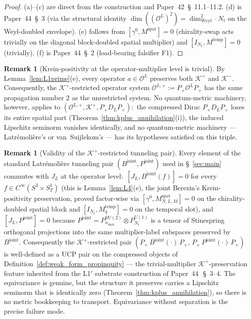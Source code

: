\documentclass[11pt,a4paper]{article}
\theoremstyle{plain}
\theoremstyle{definition}
\newtheorem{remark}[theorem]{Remark}
\newcommand{\nmax}{n_{\max}}
\newcommand{\Nt}{N_{t}}
\newcommand{\Manifold}{S^{3}\times S^{1}_{T}}
\newcommand{\Krein}{\mathcal{K}}
\newcommand{\Op}{\mathcal{O}}
\newcommand{\SU}{\mathrm{SU}}
\newcommand{\Uone}{U(1)}
\newcommand{\DL}{D_{L}}
\newcommand{\JL}{J_{L}}
\newcommand{\Bjoint}{B^{\mathrm{joint}}}
\newcommand{\Pjoint}{P^{\mathrm{joint}}}
\newcommand{\Kplus}{\Krein^{+}}
\newcommand{\Kminus}{\Krein^{-}}
\newcommand{\Pplus}{P_{+}}
\newcommand{\spat}{\mathrm{spat}}
\newcommand{\temp}{\mathrm{temp}}
\newcommand{\Weyl}{\mathrm{Weyl}}
\begin{document}
\begin{proof}
(a)--(c) are direct from the construction and Paper~42~\S~11.1--11.2.
(d) is Paper~44~\S~3 (via the structural identity $\dim((\Op^{L})^{2})
= \dim_{\Weyl}^{2} \cdot \Nt$ on the Weyl-doubled envelope).
(e) follows from $[\gamma^{0}, M^{\spat}] = 0$ (chirality-swap acts
trivially on the diagonal block-doubled spatial multiplier) and
$[I_{\Nt}, M^{\temp}] = 0$ (trivially). (f) is Paper~44~\S~2 (load-bearing
falsifier F1). \qedhere
\end{proof}

\begin{remark}[Krein-positivity at the operator-multiplier level is
trivial]\label{rem:Kplus_trivial}
By Lemma~\ref{lem:L1prime}(e), every operator $a \in \Op^{L}$
preserves both $\Kplus$ and $\Kminus$. Consequently, the
$\Kplus$-restricted operator system $\Op^{L,+} := \Pplus
\Op^{L} \Pplus$ has the same propagation number $2$ as the
unrestricted system. No quantum-metric machinery, however, applies
to $(\Op^{L,+}, \Kplus, \Pplus \DL \Pplus)$:\ the
compressed Dirac $\Pplus \DL \Pplus$ loses its entire spatial part
(Theorem~\ref{thm:kplus_annihilation}(i)), the induced Lipschitz
seminorm vanishes identically, and no quantum-metric machinery —
Latr\'emoli\`ere's or van~Suijlekom's — has its hypotheses satisfied
on this triple.
\end{remark}

\begin{remark}[Validity of the $\Kplus$-restricted tunneling pair]
\label{rem:Kplus_tunnel_valid}
Every element of the standard Latr\'emoli\`ere tunneling pair
$(\Bjoint, \Pjoint)$ used in \S~\ref{sec:main} commutes with $\JL$
at the operator level:\ $[\JL, \Bjoint(f)] = 0$ for every
$f \in C^{\infty}(\Manifold)$ (this is Lemma~\ref{lem:L4}(e), the
joint Berezin's Krein-positivity preservation, proved factor-wise via
$[\gamma^{0}, M^{\spat}_{N,L,M}] = 0$ on the chirality-doubled spatial
block and $[I_{\Nt}, M^{\temp}_{q}] = 0$ on the temporal slot), and
$[\JL, \Pjoint] = 0$ because $\Pjoint = P^{\SU(2)}_{\nmax} \otimes
P^{\Uone}_{\Nt}$ is a tensor of Stinespring orthogonal projections
into the same multiplier-label subspaces preserved by $\Bjoint$.
Consequently the $\Kplus$-restricted pair
$(\Pplus\,\Bjoint(\cdot)\,\Pplus,\, \Pplus\,\Pjoint(\cdot)\,\Pplus)$ is
well-defined as a UCP pair on the compressed objects of
Definition~\ref{def:weak_form_propinquity} — the trivial-multiplier
$\Kplus$-preservation feature inherited from the L1$'$ substrate
construction of Paper~44~\cite{paper44}\,\S~3--4. The equivariance
is genuine, but the structure it
preserves carries a Lipschitz seminorm that is identically zero
(Theorem~\ref{thm:kplus_annihilation}), so there is no metric
bookkeeping to transport. Equivariance without separation is the
precise failure mode.
\end{remark}
\end{document}
